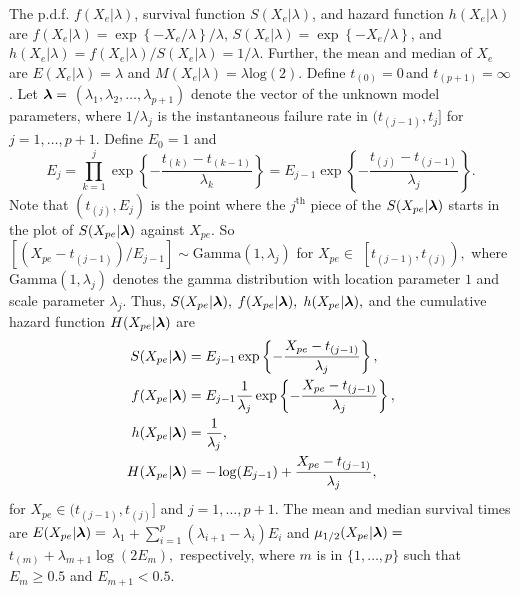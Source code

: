 \documentclass[12pt] {article}
\newcommand{\bt}[1]{\mbox{\boldmath $#1$}}
\begin{document}
The p.d.f. $f(X_e|\lambda)$,
survival function $S(X_e|\lambda)$, and hazard
function $h(X_e|\lambda)$ are
$f(X_e|\lambda) = \exp \left\{ -X_e/\lambda \right\}/\lambda$,
$S(X_e|\lambda) = \exp \left\{ -X_e/\lambda \right\}$, and
$h(X_e|\lambda) = f(X_e|\lambda)/S(X_e|\lambda) = 1/\lambda.$
Further, the mean and median of $X_e$ are
$E(X_e|\lambda)=\lambda$ and $M(X_e|\lambda) = \lambda \textrm{log}(2).$
Define $t_{\left(0\right)}=0\,$and $t_{(p+1)}=\infty$. Let
$\bt{\lambda}=$ $(\lambda_1,\lambda_2,\ldots,\lambda_{p+1})$ denote
the vector of the unknown model parameters, where $1/\lambda_j$ is the
instantaneous failure rate in $(t_{(j-1)},t_j]$ for
$j=1,\ldots,p+1$. Define $E_0 = 1$ and
$$E_j = \prod_{k=1}^j \exp
\left\{ -\frac{t_{(k)} - t_{(k-1)}}{\lambda_k} \right\}
= E_{j-1} \exp
\left\{ -\frac{t_{(j)} - t_{(j-1)}}{\lambda_j} \right\}.$$
Note that $(t_{(j)}, E_j)$ is the point where the
$j^{\text{th}}$ piece of the $S(X_{pe}|\bt{\lambda})$ starts
in the plot of $S(X_{pe}|\bt{\lambda})$ against $X_{pe}.$
So $\left[(X_{pe}-t_{(j-1)})/E_{j-1}\right]\sim
\textrm{Gamma}(1,\lambda_{j})$
for $X_{pe}\in$ $\left[t_{(j-1)},t_{(j)}\right),$
where $\textrm{Gamma}(1,\lambda_j)$ denotes the gamma distribution
with location parameter $1$ and scale parameter $\lambda_j.$
Thus, $S(X_{pe}|\bt{\lambda}),$
$f(X_{pe}|\bt{\lambda}),$ $h(X_{pe}|\bt{\lambda}),$ and the cumulative
hazard function $H(X_{pe}|\bt{\lambda})$ are
\begin{equation}
\label{survY}
\begin{aligned}
S(X_{pe}|\bt{\lambda}) & =  E_{j-1} \exp \left\{
-\frac{X_{pe}-t_{(j-1)}}{\lambda_j} \right\}, \\
f(X_{pe}|\bt{\lambda}) & =  E_{j-1} \frac{1}{\lambda_j}
\exp \left\{ -\frac{X_{pe}-t_{(j-1)}}{\lambda_j} \right\}, \\
h(X_{pe}|\bt{\lambda}) & =  \frac{1}{\lambda_j}, \\
H(X_{pe}|\bt{\lambda}) & =  -\log(E_{j-1}) + \frac{X_{pe}-t_{(j-1)}}{\lambda_j},
\end{aligned}
\end{equation}
for $X_{pe} \in (t_{(j-1)},t_{(j)}]$ and $j=1,\dots,p+1$.
The mean and median survival times are
$E(X_{pe}|\bt{\lambda})=$
$\lambda_1 + \sum_{i=1}^p(\lambda_{i+1}-\lambda_i)E_i$
and
$\mu_{1/2}(X_{pe}|\bt{\lambda})=$
$t_{(m)} + \lambda_{m+1} \log (2 E_m),$ respectively,
where $m$ is in $\{1,\ldots,p\}$
such that $E_m \geq 0.5$ and $E_{m+1} < 0.5$.
\end{document}
